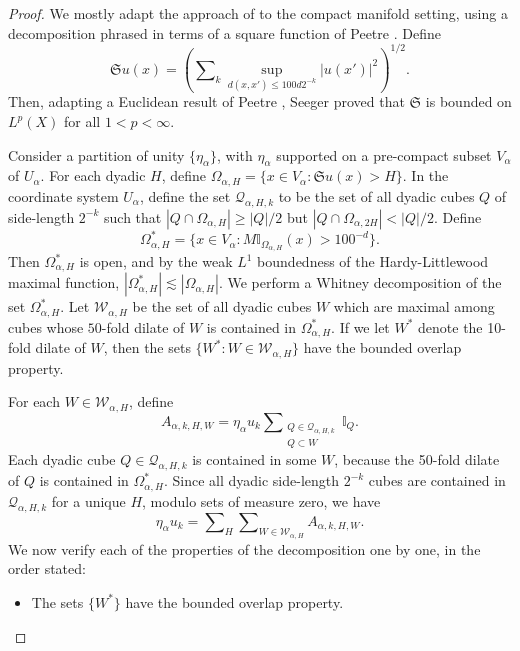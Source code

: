 \begin{proof}
    We mostly adapt the approach of \cite{HeoandNazarovandSeeger2} to the compact manifold setting, using a decomposition phrased in terms of a square function of Peetre \cite{Peetre}. Define
    \begin{equation}
        \mathfrak{S}u(x) = \left( \sum\nolimits_k \sup_{d(x,x') \leq 100 d 2^{-k} } |u(x')|^2 \right)^{1/2}.
    \end{equation}
    Then, adapting a Euclidean result of Peetre \cite{Peetre}, Seeger \cite{SeegerEndpointEstimatesMultipliers} proved that $\mathfrak{S}$ is bounded on $L^p(X)$ for all $1 < p < \infty$.

    Consider a partition of unity $\{ \eta_\alpha \}$, with $\eta_\alpha$ supported on a pre-compact subset $V_\alpha$ of $U_\alpha$. For each dyadic $H$, define $\Omega_{\alpha,H} = \{ x \in V_\alpha : \mathfrak{S} u(x) > H \}$. In the coordinate system $U_\alpha$, define the set $\mathcal{Q}_{\alpha, H,k}$ to be the set of all dyadic cubes $Q$ of side-length $2^{-k}$ such that $|Q \cap \Omega_{\alpha,H}| \geq |Q| / 2$ but $|Q \cap \Omega_{\alpha,2H}| < |Q|/2$. Define
    \begin{equation}
        \Omega_{\alpha,H}^* = \{ x \in V_\alpha : M \mathbb{I}_{\Omega_{\alpha,H}}(x) > 100^{-d} \}.
    \end{equation}
    Then $\Omega_{\alpha,H}^*$ is open, and by the weak $L^1$ boundedness of the Hardy-Littlewood maximal function, $|\Omega_{\alpha,H}^*| \lesssim |\Omega_{\alpha,H}|$. We perform a Whitney decomposition of the  set $\Omega_{\alpha,H}^*$. Let $\mathcal{W}_{\alpha,H}$ be the set of all dyadic cubes $W$ which are maximal among cubes whose $50$-fold dilate of $W$ is contained in $\Omega_{\alpha,H}^*$. If we let $W^*$ denote the 10-fold dilate of $W$, then the sets $\{ W^* : W \in \mathcal{W}_{\alpha,H} \}$ have the bounded overlap property.
    
    For each $W \in \mathcal{W}_{\alpha,H}$, define
    \begin{equation}
        A_{\alpha,k,H,W} = \eta_\alpha u_k \sum\nolimits_{\substack{Q \in \mathcal{Q}_{\alpha,H,k}\\Q \subset W}} \mathbb{I}_Q.
    \end{equation}
    Each dyadic cube $Q \in \mathcal{Q}_{\alpha,H,k}$ is contained in some $W$, because the 50-fold dilate of $Q$ is contained in $\Omega_{\alpha,H}^*$. Since all dyadic side-length $2^{-k}$ cubes are contained in $\mathcal{Q}_{\alpha,H,k}$ for a unique $H$, modulo sets of measure zero, we have
    \begin{equation}
        \eta_\alpha u_k = \sum \nolimits_H \sum\nolimits_{W \in \mathcal{W}_{\alpha,H}} A_{\alpha,k,H,W}.
    \end{equation}
    We now verify each of the properties of the decomposition one by one, in the order stated:
    \begin{itemize}
        \item The sets $\{ W^* \}$ have the bounded overlap property.


\end{itemize}
\end{proof}
